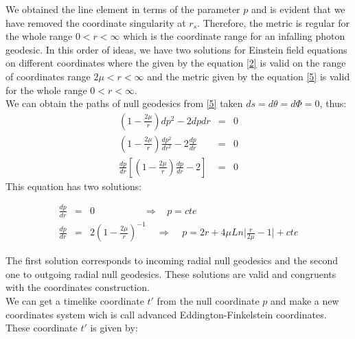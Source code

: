 \documentclass[letterpaper,11pt,onecolumn]{article}
\begin{document}
We obtained the line element in terms of the parameter $p$ and is evident that we have removed the coordinate singularity at $r_s$. Therefore, the metric is regular for the whole range $0<r<\infty$ which is the coordinate range for an infalling photon geodesic. In this order of ideas, we have two solutions for Einstein field equations on different coordinates where the given by the equation \ref{2}  is valid on the range of coordinates range $2\mu<r<\infty$ and the metric given by the equation \ref{5} is valid for the whole range $0<r<\infty$.
\\We can obtain the paths of null geodesics from \ref{5} taken $ds=d\theta=d\Phi=0$, thus:
\begin{eqnarray*}
\left( 1 - \frac{2\mu}{r}\right)dp^2-2dpdr&=&0\\
\left( 1 - \frac{2\mu}{r}\right)\frac{dp^2}{dr^2}-2\frac{dp}{dr}&=&0\\
\frac{dp}{dr}\left[\left( 1 - \frac{2\mu}{r}\right)\frac{dp}{dr}-2\right]&=&0
\end{eqnarray*}
This equation has two solutions:

\begin{eqnarray*}
\frac{dp}{dr}&=&0  \ \ \ \ \ \ \ \  \ \ \ \ \ \ \ \ \ \ \ \ \ \ \ \Rightarrow \ \ \ \  p=cte \\
\frac{dp}{dr}&=&2\left( 1 - \frac{2\mu}{r}\right)^{-1}
 \ \ \ \ \ \Rightarrow \ \ \ \ \ p=2r+4\mu Ln\Big| \frac{r}{2\mu}-1 \Big|+cte 
\end{eqnarray*} 

The first solution corresponds to incoming radial null geodesics and the second one to outgoing radial null geodesics. These solutions are valid and congruents with the coordinates construction.\\

We can get a timelike coordinate $t'$ from the null coordinate $p$ and make a new coordinates system wich is call advanced Eddington-Finkelstein coordinates. These coordinate $t'$ is given by:
\end{document}
